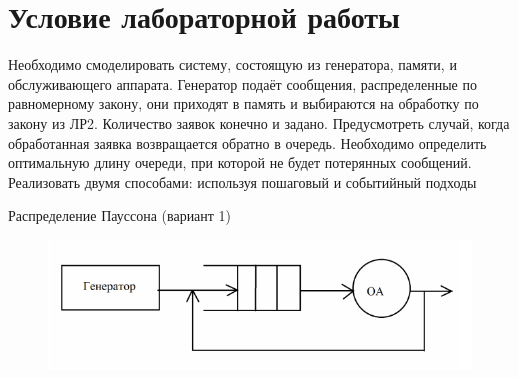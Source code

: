 \section{Условие лабораторной работы}

Необходимо смоделировать систему, состоящую из генератора, памяти, и обслуживающего аппарата. 
Генератор подаёт сообщения, распределенные по равномерному закону, они приходят в память и выбираются на обработку по закону из ЛР2. 
Количество заявок конечно и задано. Предусмотреть случай, когда обработанная заявка возвращается обратно в очередь. 
Необходимо определить оптимальную длину очереди, при которой не будет потерянных сообщений. Реализовать двумя способами: используя пошаговый и событийный подходы

Распределение Пауссона (вариант 1)

\begin{figure}[h]
	\centering
	\includegraphics[width=0.7\linewidth]{src/CMO}
	\caption{}
	\label{fig:cmo}
\end{figure}

